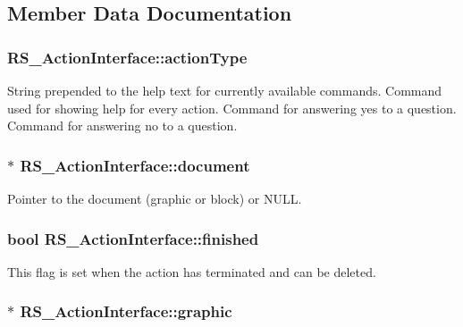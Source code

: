 \subsection{Member Data Documentation}
\hypertarget{classRS__ActionInterface_ad040e10c710fc045051175336b50fda0}{
\subsubsection[{action\-Type}]{ R\-S\-\_\-\-Action\-Interface\-::action\-Type\hspace{0.3cm}{\ttfamily [protected]}}}\label{classRS__ActionInterface_ad040e10c710fc045051175336b50fda0}
String prepended to the help text for currently available commands. Command used for showing help for every action. Command for answering yes to a question. Command for answering no to a question. \hypertarget{classRS__ActionInterface_a686d15b5bd077529cd4d5e0707fb0773}{
\subsubsection[{document}]{$\ast$ R\-S\-\_\-\-Action\-Interface\-::document\hspace{0.3cm}{\ttfamily [protected]}}}\label{classRS__ActionInterface_a686d15b5bd077529cd4d5e0707fb0773}
Pointer to the document (graphic or block) or N\-U\-L\-L. \hypertarget{classRS__ActionInterface_aa6292f30c3efae59a21c3503346f0976}{
\subsubsection[{finished}]{\setlength{\rightskip}{0pt plus 5cm}bool R\-S\-\_\-\-Action\-Interface\-::finished\hspace{0.3cm}{\ttfamily [protected]}}}\label{classRS__ActionInterface_aa6292f30c3efae59a21c3503346f0976}
This flag is set when the action has terminated and can be deleted. \hypertarget{classRS__ActionInterface_a2853d0c3e15d00e2fd2c0358b5c0dd40}{
\subsubsection[{graphic}]{$\ast$ R\-S\-\_\-\-Action\-Interface\-::graphic\hspace{0.3cm}{\ttfamily [protected]}}}\label{classRS__ActionInterface_a2853d0c3e15d00e2fd2c0358b5c0dd40}
